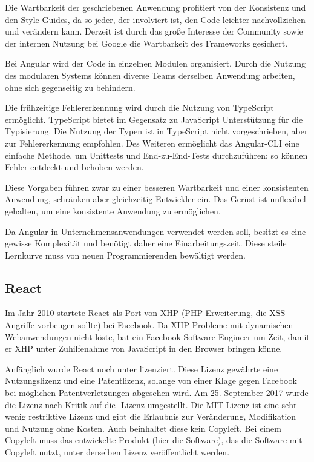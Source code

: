 \newpage
Die Wartbarkeit der geschriebenen Anwendung profitiert von der Konsistenz und den Style Guides, da so jeder, der involviert ist, den Code leichter nachvollziehen und verändern kann. Derzeit ist durch das große Interesse der Community sowie der internen Nutzung bei Google die Wartbarkeit des Frameworks gesichert. \cite{wahlinWesentlichenVorteileAngular2017}

Bei Angular wird der Code in einzelnen Modulen organisiert. Durch die Nutzung des modularen Systems können diverse Teams derselben Anwendung arbeiten, ohne sich gegenseitig zu behindern. \cite{wahlinWesentlichenVorteileAngular2017}

Die frühzeitige Fehlererkennung wird durch die Nutzung von TypeScript ermöglicht. \linebreak TypeScript bietet im Gegensatz zu JavaScript Unterstützung für die Typisierung. Die Nutzung der Typen ist in TypeScript nicht vorgeschrieben, aber zur Fehlererkennung empfohlen.
Des Weiteren ermöglicht das Angular-CLI eine einfache Methode, um Unittests und End-zu-End-Tests durchzuführen; so können Fehler entdeckt und behoben werden. \cite{wahlinWesentlichenVorteileAngular2017}

Diese Vorgaben führen zwar zu einer besseren Wartbarkeit und einer konsistenten Anwendung, schränken aber gleichzeitig Entwickler ein. Das Gerüst ist unflexibel gehalten, um eine konsistente Anwendung zu ermöglichen.

Da Angular in Unternehmensanwendungen verwendet werden soll, besitzt es eine gewisse Komplexität und benötigt daher eine Einarbeitungszeit. Diese steile Lernkurve muss von neuen Programmierenden bewältigt werden. \cite{ventzkemediaAngularVsReact2018}

\subsection{React}
Im Jahr 2010 startete React als Port von XHP (PHP-Erweiterung, die XSS Angriffe vorbeugen sollte) bei Facebook. Da XHP Probleme mit dynamischen Webanwendungen nicht löste, bat ein Facebook Software-Engineer um Zeit, damit er XHP unter Zuhilfenahme von JavaScript in den Browser bringen könne. \cite{dawsonJavaScriptHistoryHow2014}

Anfänglich wurde React noch unter  lizenziert. Diese Lizenz gewährte eine Nutzungslizenz und eine Patentlizenz, solange von einer Klage gegen Facebook bei möglichen Patentverletzungen abgesehen wird. Am 25. September 2017 wurde die Lizenz nach Kritik auf die -Lizenz umgestellt. \cite{kripalaniIfYouRe2017} \cite{larsonFacebookJustChanged2017} Die MIT-Lizenz ist eine sehr wenig restriktive Lizenz und gibt die Erlaubnis zur Veränderung, Modifikation und Nutzung ohne Kosten. Auch beinhaltet diese kein Copyleft. Bei einem Copyleft muss das entwickelte Produkt (hier die Software), das die Software mit Copyleft nutzt, unter derselben Lizenz veröffentlicht werden. \cite{wehnerSoftwareUnterMIT2020}

